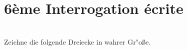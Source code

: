 


\pagestyle{empty}
\section*{6ème Interrogation écrite}

\\
Zeichne die folgende Dreiecke in wahrer Gr"o\ss e.\\
[Contenu des triangles...]
